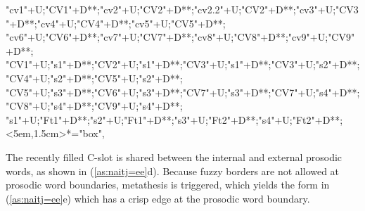 \begin{multicols}{2}
\begin{exe}
{\begin{xlist}
{		"cv1"+U;"CV1"+D**\dir{-};"cv2"+U;"CV2"+D**\dir{-};"cv2.2"+U;"CV2"+D**\dir{-};"cv3"+U;"CV3"+D**\dir{-};"cv4"+U;"CV4"+D**\dir{-};"cv5"+U;"CV5"+D**\dir{-};
		"cv6"+U;"CV6"+D**\dir{-};"cv7"+U;"CV7"+D**\dir{};"cv8"+U;"CV8"+D**\dir{-};"cv9"+U;"CV9"+D**\dir{};
		"CV1"+U;"s1"+D**\dir{-};"CV2"+U;"s1"+D**\dir{-};"CV3"+U;"s1"+D**\dir{-};"CV3"+U;"s2"+D**\dir{-};"CV4"+U;"s2"+D**\dir{-};"CV5"+U;"s2"+D**\dir{-};
		"CV5"+U;"s3"+D**\dir{-};"CV6"+U;"s3"+D**\dir{-};"CV7"+U;"s3"+D**\dir{-};"CV7"+U;"s4"+D**\dir{-};"CV8"+U;"s4"+D**\dir{-};"CV9"+U;"s4"+D**\dir{-};
		"s1"+U;"Ft1"+D**\dir{-};"s2"+U;"Ft1"+D**\dir{-};"s3"+U;"Ft2"+D**\dir{-};"s4"+U;"Ft2"+D**\dir{-};
		<5em,1.5cm>*="box",
	\endxy}\label{as:naitj=ee2}
	\end{xlist}}
\end{exe}
\end{multicols}

The recently filled C-slot is shared between the internal and external prosodic
words, as shown in (\ref{as:naitj=ee}d).
Because fuzzy borders are not allowed at prosodic word boundaries,
metathesis is triggered, which yields the form in (\ref{as:naitj=ee}e)
which has a crisp edge at the prosodic word boundary.

